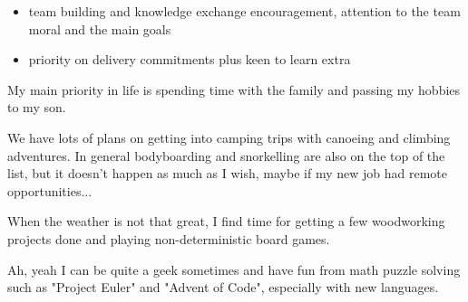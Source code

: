 \documentclass[10pt,a4paper,ragged2e,withhyper]{altacv}
\begin{document}
\begin{paracol}{2}
\begin{itemize}
    \item 
    team building and knowledge exchange encouragement, attention to the team moral and the main goals
    
    \item 
    priority on delivery commitments plus keen to learn extra

\end{itemize}






\divider



My main priority in life is spending time with the family and passing my
hobbies to my son.

We have lots of plans on getting into camping trips with canoeing and climbing
adventures.
In general bodyboarding and snorkelling are also on the top of the list,
but it doesn't
happen as much as I wish, maybe if my new job had remote opportunities...

When the weather is not that great, I find time for getting a few woodworking
projects done and playing non-deterministic board games.

Ah, yeah I can be quite a geek sometimes and have fun from math puzzle solving
such as "Project Euler" and "Advent of Code", especially with new languages.

\end{paracol}

\end{document}
